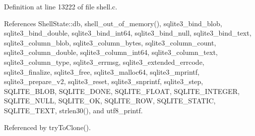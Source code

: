 Definition at line 13222 of file shell.\+c.



References Shell\+State\+::db, shell\+\_\+out\+\_\+of\+\_\+memory(), sqlite3\+\_\+bind\+\_\+blob, sqlite3\+\_\+bind\+\_\+double, sqlite3\+\_\+bind\+\_\+int64, sqlite3\+\_\+bind\+\_\+null, sqlite3\+\_\+bind\+\_\+text, sqlite3\+\_\+column\+\_\+blob, sqlite3\+\_\+column\+\_\+bytes, sqlite3\+\_\+column\+\_\+count, sqlite3\+\_\+column\+\_\+double, sqlite3\+\_\+column\+\_\+int64, sqlite3\+\_\+column\+\_\+text, sqlite3\+\_\+column\+\_\+type, sqlite3\+\_\+errmsg, sqlite3\+\_\+extended\+\_\+errcode, sqlite3\+\_\+finalize, sqlite3\+\_\+free, sqlite3\+\_\+malloc64, sqlite3\+\_\+mprintf, sqlite3\+\_\+prepare\+\_\+v2, sqlite3\+\_\+reset, sqlite3\+\_\+snprintf, sqlite3\+\_\+step, S\+Q\+L\+I\+T\+E\+\_\+\+B\+L\+OB, S\+Q\+L\+I\+T\+E\+\_\+\+D\+O\+NE, S\+Q\+L\+I\+T\+E\+\_\+\+F\+L\+O\+AT, S\+Q\+L\+I\+T\+E\+\_\+\+I\+N\+T\+E\+G\+ER, S\+Q\+L\+I\+T\+E\+\_\+\+N\+U\+LL, S\+Q\+L\+I\+T\+E\+\_\+\+OK, S\+Q\+L\+I\+T\+E\+\_\+\+R\+OW, S\+Q\+L\+I\+T\+E\+\_\+\+S\+T\+A\+T\+IC, S\+Q\+L\+I\+T\+E\+\_\+\+T\+E\+XT, strlen30(), and utf8\+\_\+printf.



Referenced by try\+To\+Clone().


